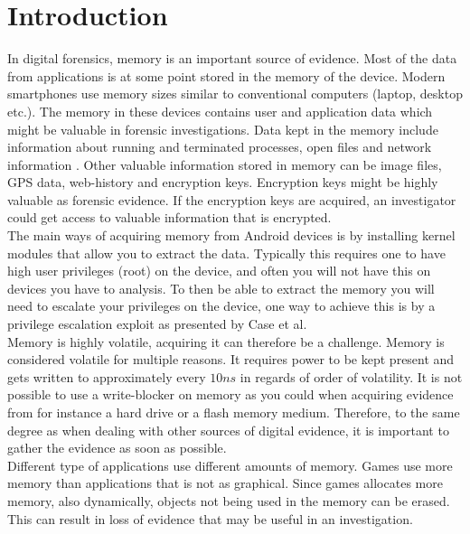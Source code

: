 \section{Introduction}

In digital forensics, memory is an important source of evidence. Most of the data from applications is at some point 
stored in the memory of the device. Modern smartphones use memory sizes similar to conventional computers (laptop, 
desktop etc.). The memory in these devices contains user and application data which might be valuable in forensic 
investigations. Data kept in the memory include information about running and terminated processes, open files and 
network information \cite{acq_vol_android_mem}. Other valuable information stored in memory can be image files, GPS data, 
web-history and encryption keys. Encryption keys might be highly valuable as forensic evidence. If the encryption keys 
are acquired, an investigator could get access to valuable information that is encrypted. \\

The main ways of acquiring memory from Android devices is by installing kernel 
modules that allow you to extract the data. Typically this requires one to
have high user privileges (root) on the device, and often you will not have 
this on devices you have to analysis. To then be able to extract the memory you 
will need to escalate your privileges on the device, one way to achieve this is by
a privilege escalation exploit as presented by Case et al\cite{acq_vol_android_mem}.\\


Memory is highly volatile, acquiring it can therefore be a challenge. Memory is 
considered volatile for multiple reasons. It requires  power to be kept present
\cite{the_art_of_mem} and gets written to approximately every $10ns$ in regards
of order of volatility. %
It is not possible to use a write-blocker on memory as you could when acquiring 
evidence from for instance a hard drive or a flash memory medium. Therefore, to 
the same degree as when dealing with other sources of digital evidence, it is 
important to gather the evidence as soon as possible. \\

Different type of applications use different amounts of memory. Games use more 
memory than applications that is not as graphical. Since games allocates more 
memory, also dynamically, objects not being used in the memory can be erased. 
This can result in loss of evidence that may be useful in an investigation.\\


